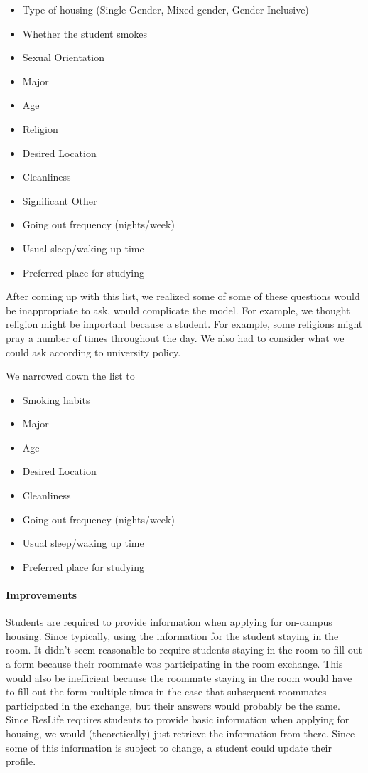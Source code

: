 \documentclass[12pt]{article}
\begin{document}
\begin{multicols}{2}
\begin{itemize}[noitemsep]
\item Type of housing (Single Gender, Mixed gender, Gender Inclusive)
\item Whether the student smokes
\item Sexual Orientation
\item Major 
\item Age
\item Religion
\item Desired Location
\item Cleanliness
\item Significant Other
\item Going out frequency (nights/week)
\item Usual sleep/waking up time
\item Preferred place for studying
\end{itemize}
After coming up with this list, we realized some of some of these questions would be inappropriate to ask, would complicate the model. For example, we thought religion might be important because a student. For example, some religions might pray a number of times throughout the day. We also had to consider what we could ask according to university policy. 


We narrowed down the list to
\begin{itemize}[noitemsep]
\item Smoking habits
\item Major 
\item Age
\item Desired Location
\item Cleanliness
\item Going out frequency (nights/week)
\item Usual sleep/waking up time
\item Preferred place for studying
\end{itemize}
\paragraph{Improvements}
Students are required to provide information when applying for on-campus housing. Since typically, using the information for the student staying in the room. It didn't seem reasonable to require students staying in the room to fill out a form because their roommate was participating in the room exchange. This would also be inefficient because the roommate staying in the room would have to fill out the form multiple times in the case that subsequent roommates participated in the exchange, but their answers would probably be the same. Since ResLife requires students to provide basic information when applying for housing, we would (theoretically) just retrieve the information from there. Since some of this information is subject to change, a student could update their profile. 



\end{multicols}
\end{document}
